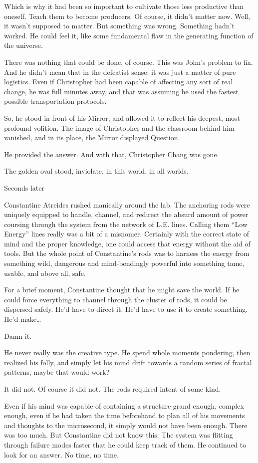Which is why it had been so important to cultivate those less productive than oneself. Teach them to become producers. Of course, it didn’t matter now. Well, it wasn’t supposed to matter. But something was wrong. Something hadn’t worked. He could feel it, like some fundamental flaw in the generating function of the universe.

There was nothing that could be done, of course. This was John’s problem to fix. And he didn’t mean that in the defeatist sense: it was just a matter of pure logistics. Even if Christopher had been capable of affecting any sort of real change, he was full minutes away, and that was assuming he used the fastest possible transportation protocols.

So, he stood in front of his Mirror, and allowed it to reflect his deepest, most profound volition. The image of Christopher and the classroom behind him vanished, and in its place, the Mirror displayed Question.

He provided the answer. And with that, Christopher Chang was gone.

The golden oval stood, inviolate, in this world, in all worlds.

Seconds later

Constantine Atreides rushed manically around the lab. The anchoring rods were uniquely equipped to handle, channel, and redirect the absurd amount of power coursing through the system from the network of L.E. lines. Calling them “Low Energy” lines really was a bit of a misnomer. Certainly with the correct state of mind and the proper knowledge, one could access that energy without the aid of tools. But the whole point of Constantine’s rods was to harness the energy from something wild, dangerous and mind-bendingly powerful into something tame, usable, and above all, safe.

For a brief moment, Constantine thought that he might save the world. If he could force everything to channel through the cluster of rods, it could be dispersed safely. He’d have to direct it. He’d have to use it to create something. He’d make…

Damn it.

He never really was the creative type. He spend whole moments pondering, then realized his folly, and simply let his mind drift towards a random series of fractal patterns, maybe that would work?

It did not. Of course it did not. The rods required intent of some kind.

Even if his mind was capable of containing a structure grand enough, complex enough, even if he had taken the time beforehand to plan all of his movements and thoughts to the microsecond, it simply would not have been enough. There was too much. But Constantine did not know this. The system was flitting through failure modes faster that he could keep track of them. He continued to look for an answer. No time, no time.

